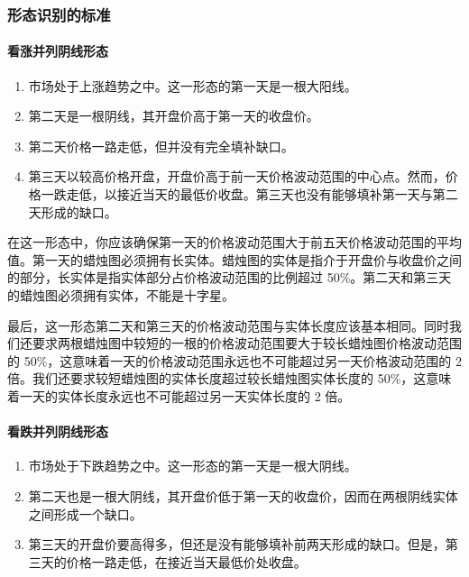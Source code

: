 \subsubsection*{形态识别的标准}
\paragraph{看涨并列阴线形态}
\begin{enumerate}
    \item 市场处于上涨趋势之中。这一形态的第一天是一根大阳线。
    \item 第二天是一根阴线，其开盘价高于第一天的收盘价。
    \item 第二天价格一路走低，但并没有完全填补缺口。
    \item 第三天以较高价格开盘，开盘价高于前一天价格波动范围的中心点。然而，价格一跌走低，以接近当天的最低价收盘。第三天也没有能够填补第一天与第二天形成的缺口。
\end{enumerate}


在这一形态中，你应该确保第一天的价格波动范围大于前五天价格波动范围的平均值。第一天的蜡烛图必须拥有长实体。蜡烛图的实体是指介于开盘价与收盘价之间的部分，长实体是指实体部分占价格波动范围的比例超过 50\%。第二天和第三天的蜡烛图必须拥有实体，不能是十字星。

最后，这一形态第二天和第三天的价格波动范围与实体长度应该基本相同。同时我们还要求两根蜡烛图中较短的一根的价格波动范围要大于较长蜡烛图价格波动范围的 50\%，这意味着一天的价格波动范围永远也不可能超过另一天价格波动范围的 2 倍。我们还要求较短蜡烛图的实体长度超过较长蜡烛图实体长度的 50\%，这意味着一天的实体长度永远也不可能超过另一天实体长度的 2 倍。

\paragraph{看跌并列阴线形态}
\begin{enumerate}
    \item 市场处于下跌趋势之中。这一形态的第一天是一根大阴线。
    \item 第二天也是一根大阴线，其开盘价低于第一天的收盘价，因而在两根阴线实体之间形成一个缺口。
    \item 第三天的开盘价要高得多，但还是没有能够填补前两天形成的缺口。但是，第三天的价格一路走低，在接近当天最低价处收盘。
\end{enumerate}

